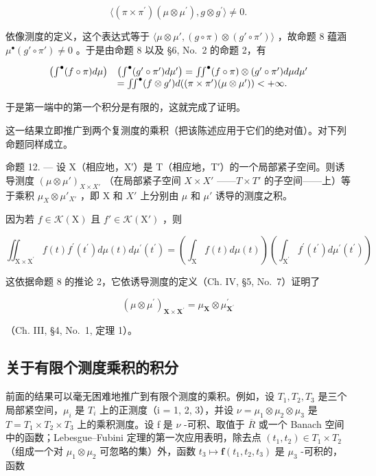 \[
\langle (\pi \times \pi^ {\prime}) (\mu \otimes \mu^ {\prime}), g \otimes g ^ {\prime} \rangle \neq 0.
\]

依像测度的定义，这个表达式等于 \(\langle\mu\otimes\mu',(g\circ\pi)\otimes(g'\circ\pi')\rangle\) ，故命题 8 蕴涵 \(\mu^{\bullet}(g'\circ\pi')\neq0\) 。于是由命题 8 以及 §6, No.~2 的命题 2，有

\[
\begin{array}{r l} \left(\int^ {\bullet} (f \circ \pi) d \mu\right) & \left(\int^ {\bullet} (g ^ {\prime} \circ \pi^ {\prime}) d \mu^ {\prime}\right) = \iint^ {\bullet} (f \circ \pi) \otimes (g ^ {\prime} \circ \pi^ {\prime}) d \mu d \mu^ {\prime} \\ & = \iint^ {\bullet} (f \otimes g ^ {\prime}) d ((\pi \times \pi^ {\prime}) (\mu \otimes \mu^ {\prime})) <   + \infty . \end{array}
\]

于是第一端中的第一个积分是有限的，这就完成了证明。

这一结果立即推广到两个复测度的乘积（把该陈述应用于它们的绝对值）。对下列命题同样成立。

命题 12. --- 设 X（相应地，X′）是 T（相应地，T′）的一个局部紧子空间。则诱导测度 \((\mu \otimes \mu')_{X \times X'}\) （在局部紧子空间 \(X \times X'\) ——\(T \times T'\) 的子空间——上）等于乘积 \(\mu_{X} \otimes \mu'_{X'}\) ，即 X 和 \(X'\) 上分别由 \(\mu\) 和 \(\mu'\) 诱导的测度之积。

因为若 \(f \in \mathcal{K}(\mathrm{X})\) 且 \(f' \in \mathcal{K}(\mathrm{X}')\) ，则

\[
\iint_ {\mathrm{X} \times \mathrm{X} ^ {\prime}} f (t) f ^ {\prime} (t ^ {\prime}) d \mu (t) d \mu^ {\prime} (t ^ {\prime}) = \left(\int_ {\mathrm{X}} f (t) d \mu (t)\right) \left(\int_ {\mathrm{X} ^ {\prime}} f ^ {\prime} (t ^ {\prime}) d \mu^ {\prime} (t ^ {\prime})\right)
\]

这依据命题 8 的推论 2，它依诱导测度的定义（Ch. IV, §5, No.~7）证明了

\[
(\mu \otimes \mu^ {\prime}) _ {\mathbf {X} \times \mathbf {X} ^ {\prime}} = \mu_ {\mathbf {X}} \otimes \mu_ {\mathbf {X} ^ {\prime}} ^ {\prime}
\]

（Ch. III, §4, No.~1, 定理 1）。

\subsection{关于有限个测度乘积的积分}

前面的结果可以毫无困难地推广到有限个测度的乘积。例如，设 \(T_{1}, T_{2}, T_{3}\) 是三个局部紧空间，\(\mu_{i}\) 是 \(T_{i}\) 上的正测度（i = 1, 2, 3），并设 \(\nu = \mu_{1} \otimes \mu_{2} \otimes \mu_{3}\) 是 \(T = T_{1} \times T_{2} \times T_{3}\) 上的乘积测度。设 f 是 \(\nu\) -可积、取值于 \(\overline{R}\) 或一个 Banach 空间中的函数；Lebesgue--Fubini 定理的第一次应用表明，除去点 \((t_{1}, t_{2}) \in T_{1} \times T_{2}\) （组成一个对 \(\mu_{1} \otimes \mu_{2}\) 可忽略的集）外，函数 \(t_{3} \mapsto \mathbf{f}(t_{1}, t_{2}, t_{3})\) 是 \(\mu_{3}\) -可积的，函数

